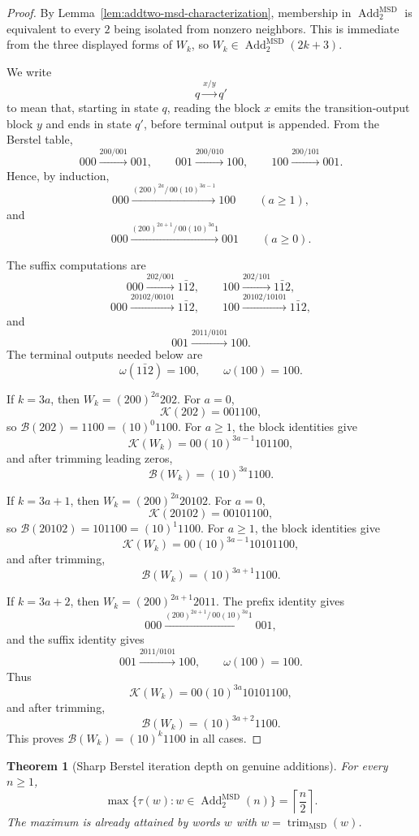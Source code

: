 \documentclass[11pt,letterpaper]{article}
\numberwithin{equation}{section}
\theoremstyle{plain}
\newtheorem{theorem}{Theorem}[section]
\theoremstyle{definition}
\theoremstyle{remark}
\newcommand{\AddTwo}{\operatorname{Add}_{2}}
\newcommand{\Berstel}{\mathcal{B}}
\newcommand{\trimMSD}{\operatorname{trim}_{\mathrm{MSD}}}
\begin{document}
\begin{proof}
By Lemma~\ref{lem:addtwo-msd-characterization}, membership in
$\AddTwo^{\mathrm{MSD}}$ is equivalent to every $2$ being isolated from
nonzero neighbors.  This is immediate from the three displayed forms of
$W_k$, so $W_k\in\AddTwo^{\mathrm{MSD}}(2k+3)$.

We write
\[
q\xrightarrow{x/y}q'
\]
to mean that, starting in state $q$, reading the block $x$ emits the
transition-output block $y$ and ends in state $q'$, before terminal output is
appended.  From the Berstel table,
\[
000\xrightarrow{200/001}001,\qquad
001\xrightarrow{200/010}100,\qquad
100\xrightarrow{200/101}001.
\]
Hence, by induction,
\[
000\xrightarrow{(200)^{2a}/\,00(10)^{3a-1}}100
\qquad (a\ge 1),
\]
and
\[
000\xrightarrow{(200)^{2a+1}/\,00(10)^{3a}1}001
\qquad (a\ge 0).
\]

The suffix computations are
\[
000\xrightarrow{202/001}1\bar{1}2,\qquad
100\xrightarrow{202/101}1\bar{1}2,
\]
\[
000\xrightarrow{20102/00101}1\bar{1}2,\qquad
100\xrightarrow{20102/10101}1\bar{1}2,
\]
and
\[
001\xrightarrow{2011/0101}100.
\]
The terminal outputs needed below are
\[
\omega(1\bar{1}2)=100,\qquad \omega(100)=100.
\]

If $k=3a$, then $W_k=(200)^{2a}202$.  For $a=0$,
\[
\mathcal K(202)=001100,
\]
so $\Berstel(202)=1100=(10)^0 1100$.  For $a\ge 1$, the block identities give
\[
\mathcal K(W_k)=00(10)^{3a-1}101100,
\]
and after trimming leading zeros,
\[
\Berstel(W_k)=(10)^{3a}1100.
\]

If $k=3a+1$, then $W_k=(200)^{2a}20102$.  For $a=0$,
\[
\mathcal K(20102)=00101100,
\]
so $\Berstel(20102)=101100=(10)^1 1100$.  For $a\ge 1$, the block identities
give
\[
\mathcal K(W_k)=00(10)^{3a-1}10101100,
\]
and after trimming,
\[
\Berstel(W_k)=(10)^{3a+1}1100.
\]

If $k=3a+2$, then $W_k=(200)^{2a+1}2011$.  The prefix identity gives
\[
000\xrightarrow{(200)^{2a+1}/\,00(10)^{3a}1}001,
\]
and the suffix identity gives
\[
001\xrightarrow{2011/0101}100,\qquad \omega(100)=100.
\]
Thus
\[
\mathcal K(W_k)=00(10)^{3a}10101100,
\]
and after trimming,
\[
\Berstel(W_k)=(10)^{3a+2}1100.
\]
This proves $\Berstel(W_k)=(10)^k1100$ in all cases.
\end{proof}

\begin{theorem}[Sharp Berstel iteration depth on genuine additions]\label{thm:berstel-depth}
For every $n\ge 1$,
\[
\max\{\tau(w):w\in\AddTwo^{\mathrm{MSD}}(n)\}
=
\left\lceil\frac n2\right\rceil .
\]
The maximum is already attained by words $w$ with $w=\trimMSD(w)$.
\end{theorem}
\end{document}
